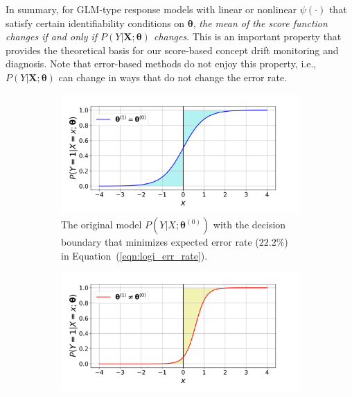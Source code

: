 \documentclass[twoside,11pt]{article}
\begin{document}
In summary, for GLM-type response models with linear or nonlinear $\psi(\cdot)$ that satisfy certain identifiability conditions on $\bm{\theta}$, \textit{the mean of the score function changes if and only if $P(Y|\bm{X};\bm{\theta})$ changes}. This is an important property that provides the theoretical basis for our score-based concept drift monitoring and diagnosis. Note that error-based methods do not enjoy this property, i.e., $P(Y|\bm{X};\bm{\theta})$ can change in ways that do not change the error rate.

\begin{figure}[!htbp]
\centering
 \begin{subfigure}[t]{0.4\linewidth}
         \centering
         \includegraphics[width=\textwidth, trim=.2in .2in .7in .45in, clip]{../figures/v14/demons_fig/2D_logi_orig.png}
         \captionsetup{width=.95\linewidth}
         \caption{The original model $P(Y|{X};\bm{\theta}^{(0)})$ with the decision boundary that minimizes expected error rate ($22.2\%$) in Equation~(\ref{eqn:logi_err_rate}).}
         \label{fig:logi_err_rate_unch_a}
  \end{subfigure}
  \begin{subfigure}[t]{0.4\linewidth}
         \centering
         \includegraphics[width=\textwidth, trim=.2in .2in .7in .45in, clip]{../figures/v14/demons_fig/2D_logi_cd.png}

\end{subfigure}
\end{figure}
\end{document}
